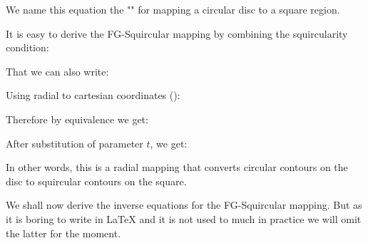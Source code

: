 	We name this equation the "" for mapping a circular disc to a square region.
	
	It is easy to derive the FG-Squircular mapping by combining the squircularity condition:
	
	That we can also write:
	
	Using radial to cartesian coordinates ():
	
	Therefore by equivalence we get:
	
	After substitution of parameter $t$, we get:
	

	In other words, this is a radial mapping that converts circular contours on the disc to squircular contours on the square.
	
	We shall now derive the inverse equations for the FG-Squircular mapping. But as it is boring to write in \LaTeX{} and it is not used to much in practice we will omit the latter for the moment.
	
